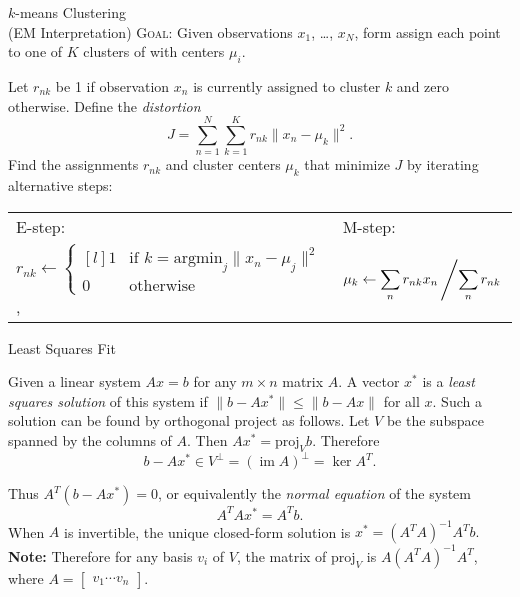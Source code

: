 \documentclass[avery5388, grid]{flashcards}
\begin{document}
\makeatletter
\renewcommand*\env@matrix[1][c]{\hskip -\arraycolsep
  \let\@ifnextchar\new@ifnextchar
  \array{*\c@MaxMatrixCols #1}}
\makeatother


\begin{flashcard}{$k$-means Clustering\\ (EM Interpretation)}
\textsc{Goal:} Given observations $x_1$, \dots, $x_N$, form assign each point to one of $K$ clusters of with centers $\mu_i$.
\begin{flushleft}
Let $r_{nk}$ be 1 if observation $x_n$ is currently assigned to cluster $k$ and zero otherwise. Define the \emph{distortion}
$$J = \sum_{n=1}^N\sum_{k=1}^K r_{nk}\| x_n - \mu_k\| ^2.$$
Find the assignments $r_{nk}$ and cluster centers $\mu_k$ that minimize $J$ by iterating alternative steps:\\
\vskip 3pt
\begin{tabular}{l l}
\textsf{E-step:} & \textsf{M-step:}\\
$r_{nk} \gets \left\{\begin{matrix}[l] 1 &  \text{if } k=\mathrm{argmin}_j \| x_n-\mu_j \|^2\\ 0 & \text{otherwise}\end{matrix}\right.$,
& $\mu_k \gets \displaystyle\sum_n r_{nk} x_n\left/\displaystyle\sum_n r_{nk}\right.$
\end{tabular}
\end{flushleft}
\end{flashcard}

\begin{flashcard}{Least Squares Fit}
\begin{flushleft}
Given  a linear system $Ax=b$ for any $m\times n$ matrix $A$. A vector $x^*$ is a \emph{least squares solution} of this system if $\|b-Ax^*\| \leq \|b-Ax\|$ for all $x$. 
\vskip 5pt
Such a solution can be found by orthogonal project as follows. Let $V$ be the subspace spanned by the columns of $A$. Then  $Ax^* = \mathrm{proj}_V b.$ Therefore $$b-Ax^*\in V^\perp = (\mathop\mathrm{im} A)^\perp = \mathop\mathrm{ker} A^T.$$

Thus $A^T(b-Ax^*)=0$, or equivalently the \emph{normal equation} of the system
$$A^TAx^* = A^Tb.$$
When $A$ is invertible, the unique closed-form solution is $x^* = (A^TA)^{-1}A^Tb.$
\vskip 5pt
\textsf{\textbf{Note:}} Therefore for any basis $v_i$ of $V$, the matrix of $\mathrm{proj}_V$ is $A(A^TA)^{-1}A^T$, where $A = \begin{bmatrix} v_1 \cdots v_n\end{bmatrix}$.
\end{flushleft}
\end{flashcard}
\end{document}
